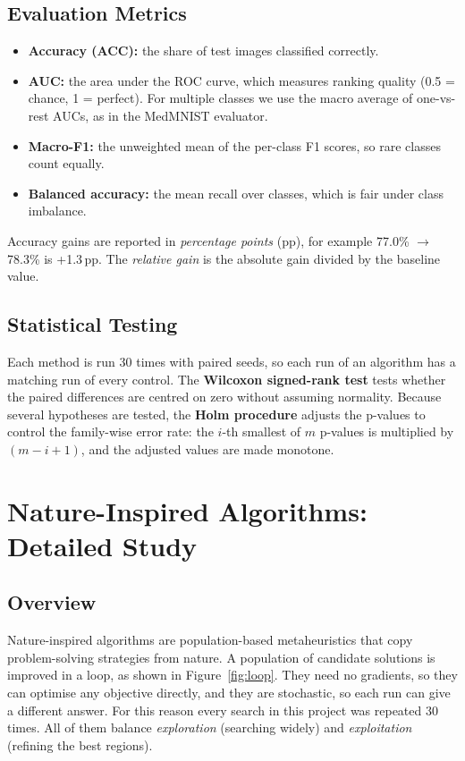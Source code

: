\documentclass[12pt,a4paper]{report}
\begin{document}
\section{Evaluation Metrics}
\begin{itemize}
  \item \textbf{Accuracy (ACC):} the share of test images classified correctly.
  \item \textbf{AUC:} the area under the ROC curve, which measures ranking quality (0.5 = chance, 1 = perfect). For
        multiple classes we use the macro average of one-vs-rest AUCs, as in the MedMNIST evaluator.
  \item \textbf{Macro-F1:} the unweighted mean of the per-class F1 scores, so rare classes count equally.
  \item \textbf{Balanced accuracy:} the mean recall over classes, which is fair under class imbalance.
\end{itemize}
Accuracy gains are reported in \emph{percentage points} (pp), for example 77.0\% $\rightarrow$ 78.3\% is
+1.3\,pp. The \emph{relative gain} is the absolute gain divided by the baseline value.

\section{Statistical Testing}
Each method is run 30 times with paired seeds, so each run of an algorithm has a matching run of every control.
The \textbf{Wilcoxon signed-rank test} \cite{wilcoxon1945} tests whether the paired differences are centred on zero
without assuming normality. Because several hypotheses are tested, the \textbf{Holm procedure} \cite{holm1979}
adjusts the p-values to control the family-wise error rate: the $i$-th smallest of $m$ p-values is multiplied by
$(m - i + 1)$, and the adjusted values are made monotone.

\chapter{Nature-Inspired Algorithms: Detailed Study}

\section{Overview}
Nature-inspired algorithms are population-based metaheuristics that copy problem-solving strategies from nature. A
population of candidate solutions is improved in a loop, as shown in Figure~\ref{fig:loop}. They need no gradients,
so they can optimise any objective directly, and they are stochastic, so each run can give a different answer. For
this reason every search in this project was repeated 30 times. All of them balance \emph{exploration} (searching
widely) and \emph{exploitation} (refining the best regions).
\end{document}
